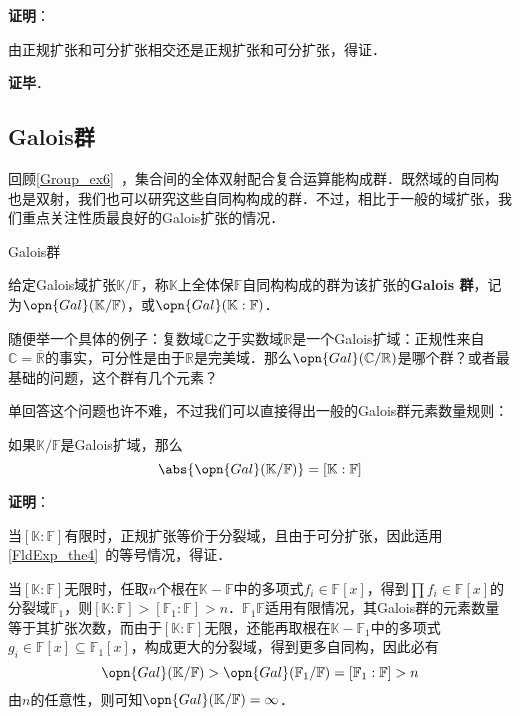 \textbf{证明}：

由正规扩张和可分扩张相交还是正规扩张和可分扩张，得证．

\textbf{证毕}．



\subsection{Galois群}

回顾\autoref{Group_ex6}~，集合间的全体双射配合复合运算能构成群．既然域的自同构也是双射，我们也可以研究这些自同构构成的群．不过，相比于一般的域扩张，我们重点关注性质最良好的Galois扩张的情况．

\begin{definition}{Galois群}\label{GExt_def2}

给定Galois域扩张$\mathbb{K}/\mathbb{F}$，称$\mathbb{K}$上全体保$\mathbb{F}$自同构构成的群为该扩张的\textbf{Galois 群}，记为$\opn{Gal}(\mathbb{K}/\mathbb{F})$，或$\opn{Gal}(\mathbb{K}:\mathbb{F})$．

\end{definition}


随便举一个具体的例子：复数域$\mathbb{C}$之于实数域$\mathbb{R}$是一个Galois扩域：正规性来自$\mathbb{C}=\overline{\mathbb{R}}$的事实，可分性是由于$\mathbb{R}$是完美域．那么$\opn{Gal}(\mathbb{C}/\mathbb{R})$是哪个群？或者最基础的问题，这个群有几个元素？

单回答这个问题也许不难，不过我们可以直接得出一般的Galois群元素数量规则：

\begin{theorem}{}\label{GExt_the2}
如果$\mathbb{K}/\mathbb{F}$是Galois扩域，那么
\begin{equation}
\abs{\opn{Gal}(\mathbb{K}/\mathbb{F})} = [\mathbb{K}:\mathbb{F}]
\end{equation}
\end{theorem}

\textbf{证明}：

当$[\mathbb{K}:\mathbb{F}]$有限时，正规扩张等价于分裂域，且由于可分扩张，因此适用\autoref{FldExp_the4}~的等号情况，得证．

当$[\mathbb{K}:\mathbb{F}]$无限时，任取$n$个根在$\mathbb{K}-\mathbb{F}$中的多项式$f_i\in\mathbb{F}[x]$，得到$\prod f_i\in\mathbb{F}[x]$的分裂域$\mathbb{F}_1$，则$[\mathbb{K}:\mathbb{F}]>[\mathbb{F}_1:\mathbb{F}]>n$．$\mathbb{F}_1\mathbb{F}$适用有限情况，其Galois群的元素数量等于其扩张次数，而由于$[\mathbb{K}:\mathbb{F}]$无限，还能再取根在$\mathbb{K}-\mathbb{F}_1$中的多项式$g_i\in\mathbb{F}[x]\subseteq \mathbb{F}_1[x]$，构成更大的分裂域，得到更多自同构，因此必有
\begin{equation}
\opn{Gal}(\mathbb{K}/\mathbb{F})>\opn{Gal}(\mathbb{F}_1/\mathbb{F})=[\mathbb{F}_1:\mathbb{F}]>n
\end{equation}
由$n$的任意性，则可知$\opn{Gal}(\mathbb{K}/\mathbb{F})=\infty$．

